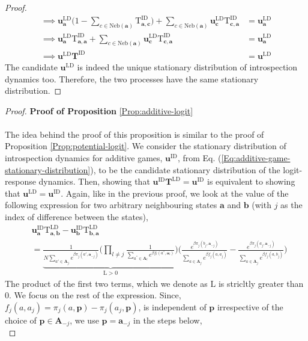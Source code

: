\documentclass[11pt]{article}
\theoremstyle{plainCl1}
\theoremstyle{plainCl2}
\newcommand{\A}{\mathbf{A}}
\newcommand{\abf}{\mathbf{a}}
\newcommand{\bbf}{\mathbf{b}}
\newcommand{\cbf}{\mathbf{c}}
\newcommand{\pbf}{\mathbf{p}}
\newcommand{\T}{\mathbf{T}}
\newcommand{\ubf}{\mathbf{u}}
\newcommand{\LD}{\mathrm{LD}}
\newcommand{\ID}{\mathrm{ID}}
\begin{document}
\begin{proof}
\begin{align}
\implies  \ubf^\LD_\abf \bigg( 1 -  \sum_{c \in \mathrm{Neb}(\abf)} \mathrm{T}^\ID_{\abf,\cbf} \bigg) + \sum_{c \in \mathrm{Neb}(\abf)}  \ubf^\LD_\cbf \mathrm{T}^\ID_{\cbf,\abf} &=  \ubf^\LD_\abf \\[10pt]
\implies \ubf^\LD_\abf \mathrm{T}^\ID_{\abf,\abf} + \sum_{c \in \mathrm{Neb}(\abf)}  \ubf^\LD_\cbf \mathrm{T}^\ID_{\cbf,\abf} &=  \ubf^\LD_\abf \\[10pt]
\label{Eq:step-2-detailed-balance}
\implies \ubf^\LD \T^\ID &= \ubf^\LD
\end{align}
\noindent The candidate $\ubf^\LD$ is indeed the unique stationary distribution of introspection dynamics too. Therefore, the two processes have the same stationary distribution.
\end{proof}

\begin{proof}
\textbf{Proof of Proposition} \ref{Prop:additive-logit} \\ \\
The idea behind the proof of this proposition is similar to the proof of Proposition \ref{Prop:potential-logit}. We consider the stationary distribution of introspection dynamics for additive games, $\ubf^\ID$, from Eq. (\ref{Eq:additive-game-stationary-distribution}), to be the candidate stationary distribution of the logit-response dynamics. Then, showing that $\ubf^\ID \T^\LD = \ubf^\ID$ is equivalent to showing that $\ubf^\LD = \ubf^\ID$. Again, like in the previous proof, we look at the value of the following expression for two arbitrary neighbouring states $\abf$ and $\bbf$ (with $j$ as the index of difference between the states), \\
\begin{align}
&\ubf^\ID_\abf \mathrm{T}^\LD_{\abf,\bbf} - \ubf^\ID_\bbf \mathrm{T}^\LD_{\bbf,\abf} \\[15pt]
&= \underbrace{\frac{1}{N \displaystyle \sum_{a' \in \A_j} e^{\beta \pi_j(a',\abf_{-j})}} \Bigg( \displaystyle \prod_{l \neq j} \frac{1}{\displaystyle \sum_{a^{''} \in \A_l} e^{\beta f_l(a^{''}, \abf_l)}} \Bigg)}_{\mathrm{L} > 0} \Bigg( 
\frac{\displaystyle e^{\beta \pi_j(b_j, \abf_{-j})}}{\displaystyle \sum_{a \in \A_j}  e^{\beta f_j(a,a_j)}}  - \frac{\displaystyle e^{\beta \pi_j(a_j, \abf_{-j})}}{\displaystyle \sum_{a \in \A_j} e^{\beta f_j(a,b_j)}} \Bigg)
\end{align}
\noindent The product of the first two terms, which we denote as $\mathrm{L}$ is stricltly greater than $0$. We focus on the rest of the expression. Since, $f_j(a,a_j) = \pi_j(a,\pbf) - \pi_j(a_j,\pbf)$, is independent of $\pbf$ irrespective of the choice of $\pbf \in \A_{-j}$, we use $\pbf = \abf_{-j}$ in the steps below,\\

\end{proof}
\end{document}
